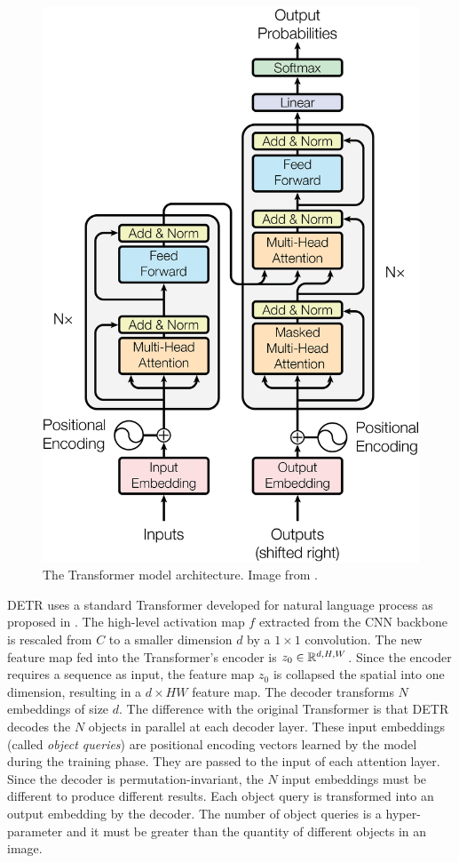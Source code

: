 \begin{figure}[h!]
	\centering
	\includegraphics[width=0.8\linewidth]{images/transformerarchitecture.png}
	\caption{The Transformer model architecture. Image from \cite{transformer}.}
	\label{fig:transformerarc}
\end{figure}

DETR \cite{detr} uses a standard Transformer developed for natural language process as proposed in \cite{transformer}. The high-level activation map $f$ extracted from the CNN backbone is rescaled from $C$ to a smaller dimension $d$ by a $1\times1$ convolution. The new feature map fed into the Transformer's encoder is $z_0 \in \mathbb{R}^{d, H, W}$. Since the encoder requires a sequence as input, the feature map $z_0$ is collapsed the spatial into one dimension, resulting in a $d\times HW$ feature map. The decoder transforms $N$ embeddings of size $d$.  The difference with the original Transformer \cite{transformer} is that DETR decodes the $N$ objects in parallel at each decoder layer. These input embeddings (called \textit{object queries}) are positional encoding vectors learned by the model during the training phase. They are passed to the input of each attention layer. Since the decoder is permutation-invariant, the $N$ input embeddings must be different to produce different results. Each object query is transformed into an output embedding by the decoder. The number of object queries is a hyper-parameter and it must be greater than the quantity of different objects in an image.

